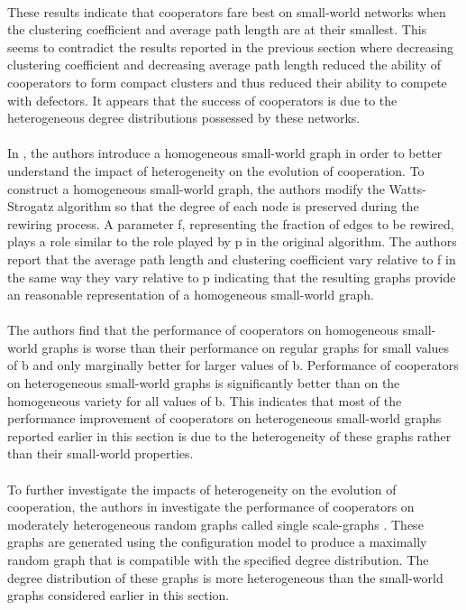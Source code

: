 \documentclass{article}
\begin{document}
	\paragraph{}These results indicate that cooperators fare best on small-world networks when the clustering coefficient and average path length are at their smallest.  This seems to contradict the results reported in the previous section where decreasing clustering coefficient and decreasing average path length reduced the ability of cooperators to form compact clusters and thus reduced their ability to compete with defectors.  It appears that the success of cooperators is due to the heterogeneous degree distributions possessed by these networks.
	\paragraph{}In \cite{Santos2005a}, the authors introduce a homogeneous small-world graph in order to better understand the impact of heterogeneity on the evolution of cooperation.  To construct a homogeneous small-world graph, the authors modify the Watts-Strogatz algorithm so that the degree of each node is preserved during the rewiring process.  A parameter f, representing the fraction of edges to be rewired, plays a role similar to the role played by p in the original algorithm.  The authors report that the average path length and clustering coefficient vary relative to f in the same way they vary relative to p indicating that the resulting graphs provide an reasonable representation of a homogeneous small-world graph.
	\paragraph{}The authors find that the performance of cooperators on homogeneous small-world graphs is worse than their performance on regular graphs for small values of b and only marginally better for larger values of b.  Performance of cooperators on heterogeneous small-world graphs is significantly better than on the homogeneous variety for all values of b.  This indicates that most of the performance improvement of cooperators on heterogeneous small-world graphs reported earlier in this section is due to the heterogeneity of these graphs rather than their small-world properties.
	\paragraph{}To further investigate the impacts of heterogeneity on the evolution of cooperation, the authors in \cite{Santos2006c} investigate the performance of cooperators on moderately heterogeneous random graphs called single scale-graphs \cite{Amaral2000}.  These graphs are generated using the configuration model \cite{Molloy1995} to produce a maximally random graph that is compatible with the specified degree distribution.  The degree distribution of these graphs is more heterogeneous than the small-world graphs considered earlier in this section.
\end{document}
